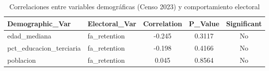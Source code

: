 \begin{table}
\caption{Correlaciones entre variables demográficas (Censo 2023) y comportamiento electoral}
\label{tab:census_correlations}
\begin{tabular}{llccc}
\toprule
Demographic_Var & Electoral_Var & Correlation & P_Value & Significant \\
\midrule
edad_mediana & fa_retention & -0.245 & 0.3117 & No \\
pct_educacion_terciaria & fa_retention & -0.198 & 0.4166 & No \\
poblacion & fa_retention & 0.045 & 0.8564 & No \\
\bottomrule
\end{tabular}
\end{table}
